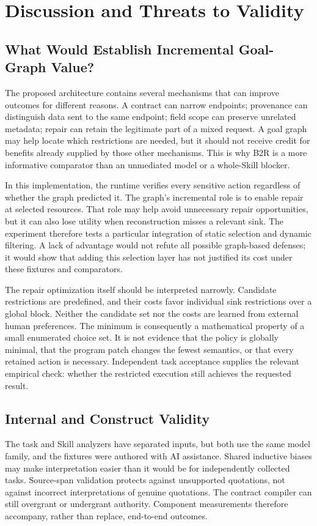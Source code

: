 \section{Discussion and Threats to Validity}
\subsection{What Would Establish Incremental Goal-Graph Value?}
The proposed architecture contains several mechanisms that can improve outcomes for different reasons. A contract can narrow endpoints; provenance can distinguish data sent to the same endpoint; field scope can preserve unrelated metadata; repair can retain the legitimate part of a mixed request. A goal graph may help locate which restrictions are needed, but it should not receive credit for benefits already supplied by those other mechanisms. This is why B2R is a more informative comparator than an unmediated model or a whole-Skill blocker.

In this implementation, the runtime verifies every sensitive action regardless of whether the graph predicted it. The graph's incremental role is to enable repair at selected resources. That role may help avoid unnecessary repair opportunities, but it can also lose utility when reconstruction misses a relevant sink. The experiment therefore tests a particular integration of static selection and dynamic filtering. A lack of advantage would not refute all possible graph-based defenses; it would show that adding this selection layer has not justified its cost under these fixtures and comparators.

The repair optimization itself should be interpreted narrowly. Candidate restrictions are predefined, and their costs favor individual sink restrictions over a global block. Neither the candidate set nor the costs are learned from external human preferences. The minimum is consequently a mathematical property of a small enumerated choice set. It is not evidence that the policy is globally minimal, that the program patch changes the fewest semantics, or that every retained action is necessary. Independent task acceptance supplies the relevant empirical check: whether the restricted execution still achieves the requested result.

\subsection{Internal and Construct Validity}
The task and Skill analyzers have separated inputs, but both use the same model family, and the fixtures were authored with AI assistance. Shared inductive biases may make interpretation easier than it would be for independently collected tasks. Source-span validation protects against unsupported quotations, not against incorrect interpretations of genuine quotations. The contract compiler can still overgrant or undergrant authority. Component measurements therefore accompany, rather than replace, end-to-end outcomes.

